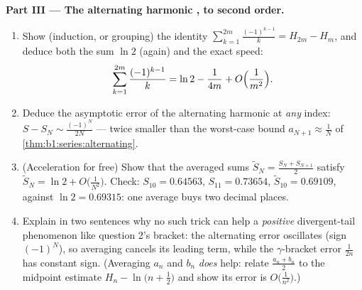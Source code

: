 \begin{problem}[{Weekend problem --- $H_n = \ln n + \gamma +
\frac{1}{2n} + O(n^{-2})$, and rearranging $1 - \frac12 +
\frac13 - \dots$ to $\frac{\ln 2}{2}$}]
\medskip
\noindent\textbf{Part III --- The alternating harmonic ,
to second order.}
\begin{enumerate}[resume]
  \item Show (induction, or grouping) the identity
        $\sum_{k=1}^{2m} \frac{(-1)^{k-1}}{k} = H_{2m} - H_m$,
        and deduce both the sum $\ln 2$ (again) and the exact
        speed:
        \[
        \sum_{k=1}^{2m} \frac{(-1)^{k-1}}{k}
        = \ln 2 - \frac{1}{4m} + O\Bigl(\frac{1}{m^2}\Bigr) .
        \]
  \item Deduce the asymptotic error of the alternating harmonic
         at \emph{any} index: $S - S_N \sim
        \frac{(-1)^N}{2N}$ --- twice smaller than the worst-case
        bound $a_{N+1} \approx \frac1N$ of
        \cref{thm:b1:series:alternating}.
  \item (Acceleration for free) Show that the averaged sums
        $\tilde S_N = \frac{S_N + S_{N+1}}{2}$ satisfy $\tilde
        S_N = \ln 2 + O\bigl(\frac{1}{N^2}\bigr)$. Check: $S_{10}
        = 0.64563$, $S_{11} = 0.73654$, $\tilde S_{10} =
        0.69109$, against $\ln 2 = 0.69315$: one average buys
        two decimal places.
  \item Explain in two sentences why no such trick can help a
        \emph{positive} divergent-tail phenomenon like question
        2's bracket: the alternating error oscillates (sign
        $(-1)^N$), so averaging cancels its leading term, while
        the $\gamma$-bracket error $\frac{1}{2n}$ has constant
        sign. (Averaging $a_n$ and $b_n$ \emph{does} help:
        relate $\frac{a_n + b_n}{2}$ to the midpoint estimate
        $H_n - \ln\bigl(n + \frac12\bigr)$ and show its error is
        $O\bigl(\frac{1}{n^2}\bigr)$.)
\end{enumerate}


\end{problem}
